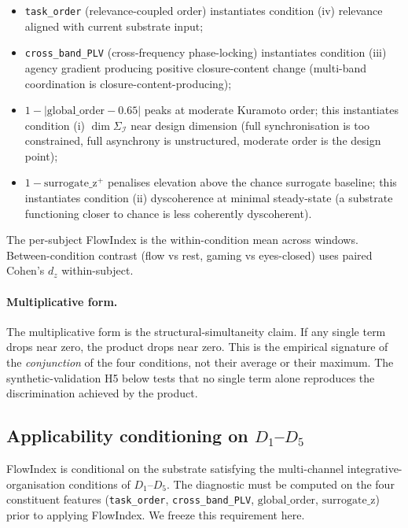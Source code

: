 \documentclass[11pt,a4paper]{article}
\begin{document}
\begin{itemize}\itemsep0pt
\item \texttt{task\_order} (relevance-coupled order) instantiates condition (iv) relevance aligned with current substrate input;
\item \texttt{cross\_band\_PLV} (cross-frequency phase-locking) instantiates condition (iii) agency gradient producing positive closure-content change (multi-band coordination is closure-content-producing);
\item $1 - |\mathrm{global\_order} - 0.65|$ peaks at moderate Kuramoto order; this instantiates condition (i) $\dim \Sigma_\mathcal{I}$ near design dimension (full synchronisation is too constrained, full asynchrony is unstructured, moderate order is the design point);
\item $1 - \mathrm{surrogate\_z}^+$ penalises elevation above the chance surrogate baseline; this instantiates condition (ii) dyscoherence at minimal steady-state (a substrate functioning closer to chance is less coherently dyscoherent).
\end{itemize}

The per-subject FlowIndex is the within-condition mean across windows. Between-condition contrast (flow vs rest, gaming vs eyes-closed) uses paired Cohen's $d_z$ within-subject.

\paragraph{Multiplicative form.} The multiplicative form is the structural-simultaneity claim. If any single term drops near zero, the product drops near zero. This is the empirical signature of the \emph{conjunction} of the four conditions, not their average or their maximum. The synthetic-validation H5 below tests that no single term alone reproduces the discrimination achieved by the product.

\subsection{Applicability conditioning on $D_1$--$D_5$}\label{sec:methods-diagnostic}

FlowIndex is conditional on the substrate satisfying the multi-channel integrative-organisation conditions of $D_1$--$D_5$. The diagnostic must be computed on the four constituent features (\texttt{task\_order}, \texttt{cross\_band\_PLV}, $\mathrm{global\_order}$, $\mathrm{surrogate\_z}$) prior to applying FlowIndex. We freeze this requirement here.
\end{document}
